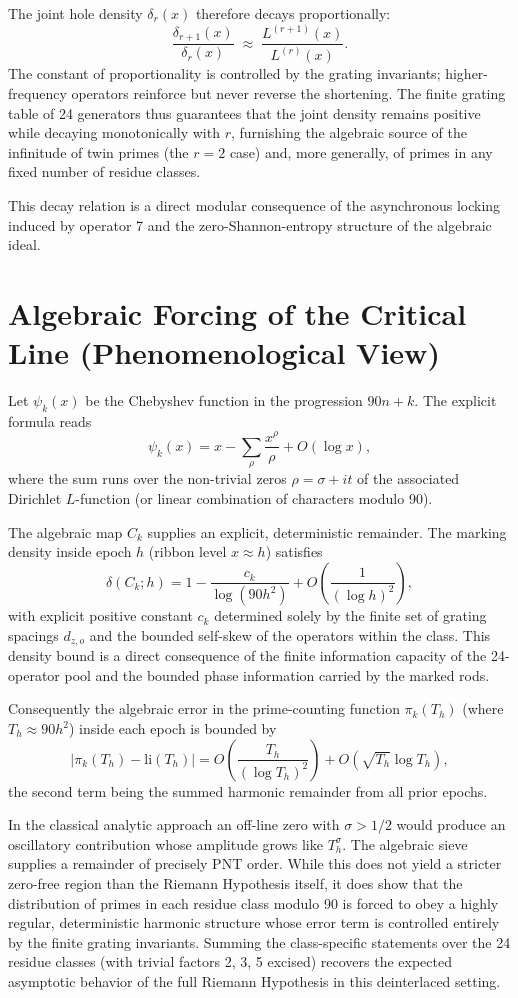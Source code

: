 \documentclass[11pt,a4paper]{article}
\begin{document}
The joint hole density \(\delta_r(x)\) therefore decays proportionally:
\[
\frac{\delta_{r+1}(x)}{\delta_r(x)} \;\approx\; \frac{L^{(r+1)}(x)}{L^{(r)}(x)}.
\]
The constant of proportionality is controlled by the grating invariants; higher-frequency operators reinforce but never reverse the shortening. The finite grating table of 24 generators thus guarantees that the joint density remains positive while decaying monotonically with \(r\), furnishing the algebraic source of the infinitude of twin primes (the \(r=2\) case) and, more generally, of primes in any fixed number of residue classes.

This decay relation is a direct modular consequence of the asynchronous locking induced by operator 7 and the zero-Shannon-entropy structure of the algebraic ideal.


\section{Algebraic Forcing of the Critical Line (Phenomenological View)}

Let \(\psi_k(x)\) be the Chebyshev function in the progression \(90n+k\). The explicit formula reads
\[
\psi_k(x) = x - \sum_{\rho} \frac{x^\rho}{\rho} + O(\log x),
\]
where the sum runs over the non-trivial zeros \(\rho = \sigma + it\) of the associated Dirichlet \(L\)-function (or linear combination of characters modulo 90).

The algebraic map \(C_k\) supplies an explicit, deterministic remainder. The marking density inside epoch \(h\) (ribbon level \(x \approx h\)) satisfies
\[
\delta(C_k;h) = 1 - \frac{c_k}{\log(90h^2)} + O\left(\frac{1}{(\log h)^2}\right),
\]
with explicit positive constant \(c_k\) determined solely by the finite set of grating spacings \(d_{z,o}\) and the bounded self-skew of the operators within the class. This density bound is a direct consequence of the finite information capacity of the 24-operator pool and the bounded phase information carried by the marked rods.

Consequently the algebraic error in the prime-counting function \(\pi_k(T_h)\) (where \(T_h \approx 90h^2\)) inside each epoch is bounded by
\[
\bigl|\pi_k(T_h) - \mathrm{li}(T_h)\bigr| = O\left( \frac{T_h}{(\log T_h)^2} \right) + O(\sqrt{T_h}\log T_h),
\]
the second term being the summed harmonic remainder from all prior epochs.

In the classical analytic approach an off-line zero with \(\sigma > 1/2\) would produce an oscillatory contribution whose amplitude grows like \(T_h^\sigma\). The algebraic sieve supplies a remainder of precisely PNT order. While this does not yield a stricter zero-free region than the Riemann Hypothesis itself, it does show that the distribution of primes in each residue class modulo 90 is forced to obey a highly regular, deterministic harmonic structure whose error term is controlled entirely by the finite grating invariants. Summing the class-specific statements over the 24 residue classes (with trivial factors 2, 3, 5 excised) recovers the expected asymptotic behavior of the full Riemann Hypothesis in this deinterlaced setting.
\end{document}
